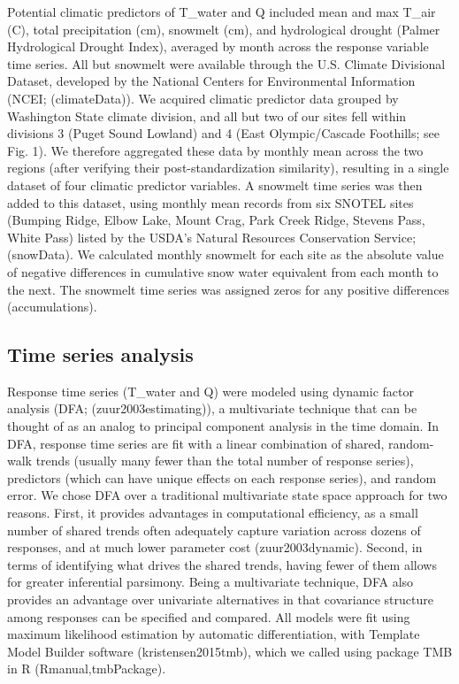 Potential climatic predictors of T_water and Q included mean and max T_air (\degree C), total precipitation (cm), snowmelt (cm), and hydrological drought (Palmer Hydrological Drought Index), averaged by month across the response variable time series. All but snowmelt were available through the U.S. Climate Divisional Dataset, developed by the National Centers for Environmental Information (NCEI; (climateData)). We acquired climatic predictor data grouped by Washington State climate division, and all but two of our sites fell within divisions 3 (Puget Sound Lowland) and 4 (East Olympic/Cascade Foothills; see Fig. 1). We therefore aggregated these data by monthly mean across the two regions (after verifying their post-standardization similarity), resulting in a single dataset of four climatic predictor variables. A snowmelt time series was then added to this dataset, using monthly mean records from six SNOTEL sites (Bumping Ridge, Elbow Lake, Mount Crag, Park Creek Ridge, Stevens Pass, White Pass) listed by the USDA's Natural Resources Conservation Service; (snowData). We calculated monthly snowmelt for each site as the absolute value of negative differences in cumulative snow water equivalent from each month to the next. The snowmelt time series was assigned zeros for any positive differences (accumulations).

\subsection*{Time series analysis}
Response time series (T_water and Q) were modeled using dynamic factor analysis (DFA; (zuur2003estimating)), a multivariate technique that can be thought of as an analog to principal component analysis in the time domain. In DFA, response time series are fit with a linear combination of shared, random-walk trends (usually many fewer than the total number of response series), predictors (which can have unique effects on each response series), and random error. We chose DFA over a traditional multivariate state space approach for two reasons. First, it provides advantages in computational efficiency, as a small number of shared trends often adequately capture variation across dozens of responses, and at much lower parameter cost (zuur2003dynamic). Second, in terms of identifying what drives the shared trends, having fewer of them allows for greater inferential parsimony. Being a multivariate technique, DFA also provides an advantage over univariate alternatives in that covariance structure among responses can be specified and compared. All models were fit using maximum likelihood estimation by automatic differentiation, with Template Model Builder software (kristensen2015tmb), which we called using package TMB in R (Rmanual,tmbPackage).

